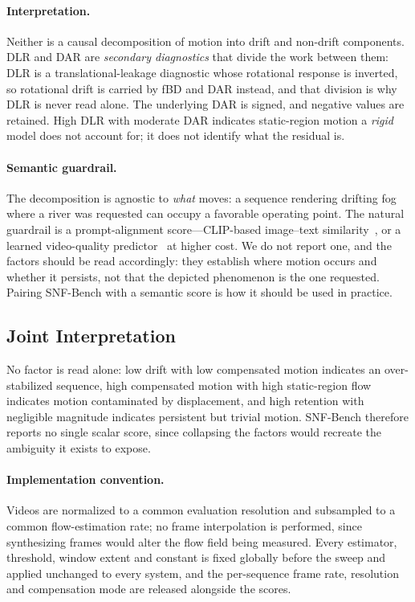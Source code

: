\paragraph{Interpretation.}
Neither is a causal decomposition of motion into drift and non-drift components. DLR and DAR are \emph{secondary diagnostics} that divide the work between them: DLR is a translational-leakage diagnostic whose rotational response is inverted, so rotational drift is carried by fBD and DAR instead, and that division is why DLR is never read alone. The underlying DAR is signed, and negative values are retained. High DLR with moderate DAR indicates static-region motion a \emph{rigid} model does not account for; it does not identify what the residual is.

\paragraph{Semantic guardrail.}
The decomposition is agnostic to \emph{what} moves: a sequence rendering drifting fog where a river was requested can occupy a favorable operating point. The natural guardrail is a prompt-alignment score---CLIP-based image--text similarity~\cite{hessel2021clipscore}, or a learned video-quality predictor~\cite{he2024videoscore} at higher cost. We do not report one, and the factors should be read accordingly: they establish where motion occurs and whether it persists, not that the depicted phenomenon is the one requested. Pairing SNF-Bench with a semantic score is how it should be used in practice.

\subsection{Joint Interpretation}
\label{sec:metric_interpretation}
No factor is read alone: low drift with low compensated motion indicates an over-stabilized sequence, high compensated motion with high static-region flow indicates motion contaminated by displacement, and high retention with negligible magnitude indicates persistent but trivial motion. SNF-Bench therefore reports no single scalar score, since collapsing the factors would recreate the ambiguity it exists to expose.

\paragraph{Implementation convention.}
Videos are normalized to a common evaluation resolution and subsampled to a common flow-estimation rate; no frame interpolation is performed, since synthesizing frames would alter the flow field being measured. Every estimator, threshold, window extent and constant is fixed globally before the sweep and applied unchanged to every system, and the per-sequence frame rate, resolution and compensation mode are released alongside the scores.
